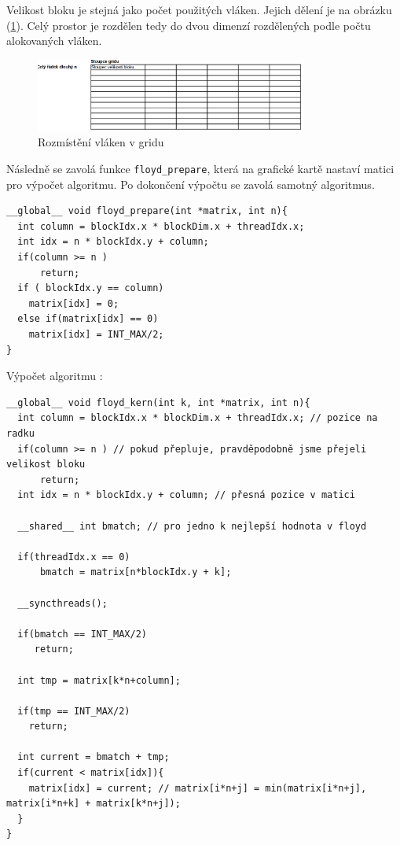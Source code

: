 \documentclass[10pt,a4paper]{article}
\begin{document}
Velikost bloku je stejná jako počet použitých vláken. Jejich dělení je na obrázku (\ref{fig:grid}). Celý prostor je rozdělen tedy do dvou dimenzí rozdělených podle počtu alokovaných vláken.

\begin{figure}[H]
  \centering
    \includegraphics[width=0.8\textwidth]{grid.png}
  \caption{Rozmístění vláken v gridu}
  \label{fig:grid}
\end{figure}

Následně se zavolá funkce \texttt{floyd\_prepare}, která na grafické kartě nastaví matici pro výpočet algoritmu. Po dokončení výpočtu se zavolá samotný algoritmus.

\begin{verbatim}
__global__ void floyd_prepare(int *matrix, int n){
  int column = blockIdx.x * blockDim.x + threadIdx.x;
  int idx = n * blockIdx.y + column;
  if(column >= n )
      return;
  if ( blockIdx.y == column)
    matrix[idx] = 0;
  else if(matrix[idx] == 0)
    matrix[idx] = INT_MAX/2;
}
\end{verbatim}

Výpočet algoritmu \cite{cudaFloyd}: 

\begin{verbatim}
__global__ void floyd_kern(int k, int *matrix, int n){
  int column = blockIdx.x * blockDim.x + threadIdx.x; // pozice na radku
  if(column >= n ) // pokud přepluje, pravděpodobně jsme přejeli velikost bloku
      return;
  int idx = n * blockIdx.y + column; // přesná pozice v matici
  
  __shared__ int bmatch; // pro jedno k nejlepší hodnota v floyd
  
  if(threadIdx.x == 0)
      bmatch = matrix[n*blockIdx.y + k];
  
  __syncthreads();
  
  if(bmatch == INT_MAX/2)
     return;
  
  int tmp = matrix[k*n+column];
  
  if(tmp == INT_MAX/2) 
    return;
  
  int current = bmatch + tmp;
  if(current < matrix[idx]){
    matrix[idx] = current; // matrix[i*n+j] = min(matrix[i*n+j], matrix[i*n+k] + matrix[k*n+j]);
  }
}
\end{verbatim}
\end{document}
